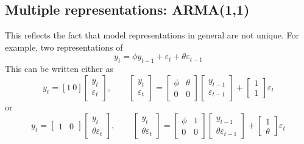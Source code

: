 \documentclass[
  letterpaper,
]{book}
\begin{document}
\hypertarget{multiple-representations-arma11}{%
\subsection{Multiple representations:
ARMA(1,1)}\label{multiple-representations-arma11}}

This reflects the fact that model representations in general are not
unique. For example, two representations of \[
    y_t = \phi y_{t-1} + \varepsilon_t + \theta \varepsilon_{t-1}  
\] This can be written either as \[
    y_t = \left[ 1 \ 0\right]  \left[ \begin{array}{c}y_t \\ \varepsilon_t \end{array}\right], \qquad
    \left[ \begin{array}{c} y_t  \\ \varepsilon_t \end{array}\right]  =
    \left[ \begin{array}{ccc} \phi & \theta \\ 0 & 0 \end{array} \right] 
    \left[ \begin{array}{c}y_{t-1} \\ \varepsilon_{t-1} \end{array}\right]   + 
    \left[ \begin{array}{c} 1 \\ 1 \end{array} \right] \varepsilon_t 
\] or \[
    y_t = \begin{bmatrix} 1 & 0 \end{bmatrix} \begin{bmatrix} y_t \\ \theta\varepsilon_t \end{bmatrix}, \qquad
    \begin{bmatrix} y_t  \\ \theta\varepsilon_t \end{bmatrix} =
    \begin{bmatrix} \phi & 1 \\ 0 & 0 \end{bmatrix}
    \begin{bmatrix} y_{t-1} \\ \theta\varepsilon_{t-1} \end{bmatrix} + 
    \begin{bmatrix} 1 \\ \theta \end{bmatrix} \varepsilon_t
\]
\end{document}
